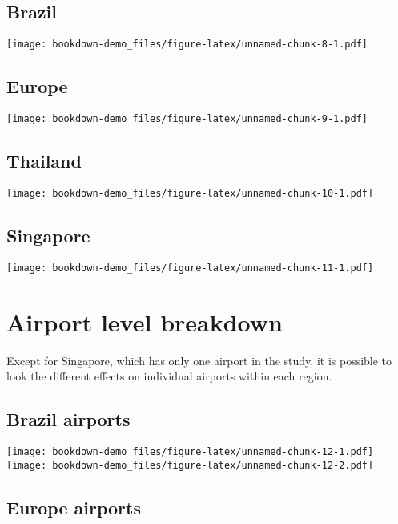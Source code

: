 \documentclass[
]{book}
\begin{document}
\hypertarget{brazil}{%
\section{Brazil}\label{brazil}}

\texttt{[image: bookdown-demo\_files/figure-latex/unnamed-chunk-8-1.pdf]}

\hypertarget{europe}{%
\section{Europe}\label{europe}}

\texttt{[image: bookdown-demo\_files/figure-latex/unnamed-chunk-9-1.pdf]}

\hypertarget{thailand}{%
\section{Thailand}\label{thailand}}

\texttt{[image: bookdown-demo\_files/figure-latex/unnamed-chunk-10-1.pdf]}

\hypertarget{singapore}{%
\section{Singapore}\label{singapore}}

\texttt{[image: bookdown-demo\_files/figure-latex/unnamed-chunk-11-1.pdf]}

\hypertarget{airport-level-breakdown}{%
\chapter{Airport level breakdown}\label{airport-level-breakdown}}

Except for Singapore, which has only one airport in the study, it is possible to look the different effects on individual airports within each region.

\hypertarget{brazil-airports-1}{%
\section{Brazil airports}\label{brazil-airports-1}}

\texttt{[image: bookdown-demo\_files/figure-latex/unnamed-chunk-12-1.pdf]} \texttt{[image: bookdown-demo\_files/figure-latex/unnamed-chunk-12-2.pdf]}

\hypertarget{europe-airports-1}{%
\section{Europe airports}\label{europe-airports-1}}
\end{document}
